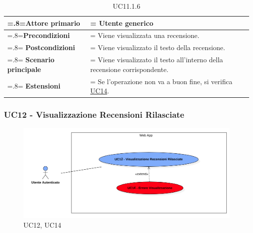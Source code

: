             \begin{table}[H]
                \centering
                \renewcommand{\arraystretch}{1.8}
                \renewcommand\tabularxcolumn[1]{m{#1}}
                \begin{tabularx}{0.9\textwidth} {
                    >{\hsize=.8\hsize\linewidth=\hsize}X
                    >{\hsize=1.2\hsize\linewidth=\hsize}X}
                    \hline
                    \textbf{Attore primario} & Utente generico \\
                    \hline
                    \textbf{Precondizioni} & Viene visualizzata una recensione. \\
                    \hline
                    \textbf{Postcondizioni} & Viene visualizzato il testo della recensione. \\
                    \hline
                    \textbf{Scenario principale} & Viene visualizzato il testo all'interno della recensione corrispondente. \\
                    \hline
                    \textbf{Estensioni} & Se l'operazione non va a buon fine, si verifica \hyperref[UC14]{UC14}. \\
                    \hline
                \end{tabularx}
                \caption{UC11.1.6}
            \end{table}

        \subsubsection{UC12 - Visualizzazione Recensioni Rilasciate}
        \label{UC12}

            \begin{figure}[H]
                \centering
                \includegraphics[scale=0.4]{src/img/UC12.png}
                \caption{UC12, UC14}
            \end{figure}

